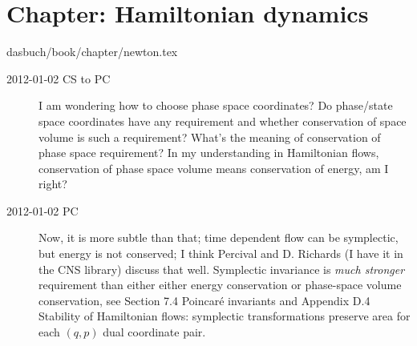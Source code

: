 \section{Chapter: Hamiltonian dynamics}
\label{c-newton}\noindent dasbuch/book/chapter/newton.tex
\begin{description}

\item[2012-01-02 CS to PC]
I am wondering how to choose phase space
coordinates? Do phase/state space coordinates have any requirement and
whether conservation of space volume is such a requirement? What's the
meaning of conservation of phase space requirement? In my understanding
in Hamiltonian flows, conservation of phase space volume means
conservation of energy, am I right?

\item[2012-01-02 PC]
Now, it is more subtle than that; time dependent flow can be symplectic,
but energy is not conserved; I think Percival and D.
Richards (I have it in the
 {CNS library})
discuss that well. Symplectic invariance is \emph{much stronger}
requirement than either either energy conservation or phase-space volume
conservation, see 
{Section 7.4 Poincar\'e invariants} and
 {Appendix D.4
Stability of Hamiltonian flows}: symplectic transformations preserve area
for each $(q,p)$ dual coordinate  pair.

\end{description}


%
%

